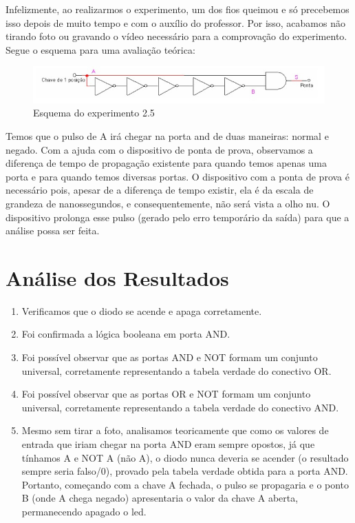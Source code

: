 \documentclass[12pt]{article}
\begin{document}
Infelizmente, ao realizarmos o experimento, um dos fios queimou e só precebemos isso depois de muito tempo e com o auxílio do professor. Por isso, acabamos não tirando foto ou gravando o vídeo necessário para a comprovação do experimento. Segue o esquema para uma avaliação teórica:

\begin{figure}[H]
	\centering
	\includegraphics[width=.5\textwidth]{esquema25.jpg}
	\caption{Esquema do experimento 2.5}
	\label{fig:portaand}
\end{figure}

	Temos que o pulso de A irá chegar na porta and de duas maneiras: normal e negado. Com a ajuda com o dispositivo de ponta de prova, observamos a diferença de tempo de propagação existente para quando temos apenas uma porta e para quando temos diversas portas. O dispositivo com a ponta de prova é necessário pois, apesar de a diferença de tempo existir, ela é da escala de grandeza de nanossegundos, e consequentemente, não será vista a olho nu. O dispositivo prolonga esse pulso (gerado pelo erro temporário da saída) para que a análise possa ser feita.

\section{Análise dos Resultados}
\label{sec:Resultados}


\begin{enumerate}
	\item Verificamos que o diodo se acende e apaga corretamente.
	\item Foi confirmada a lógica booleana em porta AND. 
	\item Foi possível observar que as portas AND e NOT formam um conjunto universal, corretamente representando a tabela verdade do conectivo OR.
	\item Foi possível observar que as portas OR e NOT formam um conjunto universal, corretamente representando a tabela verdade do conectivo AND.
	\item 	
	Mesmo sem tirar a foto, analisamos teoricamente que como os valores de entrada que iriam chegar na porta AND eram sempre opostos, já que tínhamos A e NOT A (não A), o diodo nunca deveria se acender (o resultado sempre seria falso/0), provado pela tabela verdade obtida para a porta AND. Portanto, começando com a chave A fechada, o pulso se propagaria e o ponto B (onde A chega negado) apresentaria o valor da chave A aberta, permanecendo apagado o led. 
	
\end{enumerate}
\end{document}
